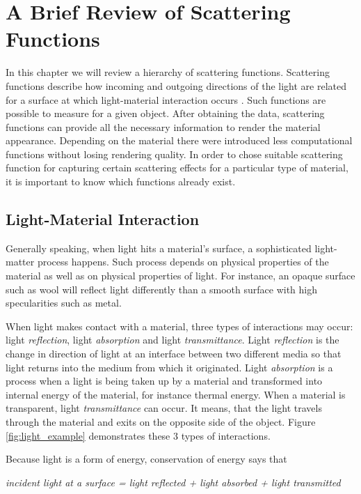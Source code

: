 \chapter{A Brief Review of Scattering Functions}
\label{chapter:appearance}

In this chapter we will review a hierarchy of scattering functions. 
Scattering functions describe how incoming and outgoing directions of the light are related for a surface at which light-material interaction occurs \cite{dong}.
Such functions are possible to measure for a given object.
After obtaining the data, scattering functions can provide all the necessary information to render the material appearance. 
 Depending on the material there were introduced less computational functions without losing rendering quality.
In order to chose suitable scattering function for capturing certain scattering effects for a particular type of material,
it is important to know which functions already exist. 

	
\section{Light-Material Interaction}
\label{section:light}	

Generally speaking, when light hits a material's surface, a sophisticated light-matter process happens.
Such process depends on physical properties of the material as well as on physical properties of light\cite{wynn}. 
For instance, an opaque surface such as wool will reflect light differently than a smooth surface with high specularities such as metal. 

 When light makes contact with a material, three types of interactions may occur: light \emph{reflection}, light \emph{absorption} and light \emph{transmittance}. 
 Light \emph{reflection} is the change in direction of light at an interface between two different media so that light returns into the medium from which it originated.
 Light \emph{absorption} is a process when a light is being taken up by a material and transformed into internal energy of the material, for instance thermal energy.
 When a material is transparent, light \emph{transmittance} can occur.
 It means, that the light travels through the material and exits on the opposite side of the object. 
   Figure \ref{fig:light_example} demonstrates these 3 types of interactions.
  
 Because light is a form of energy, conservation of energy says that \cite{wynn}
 \begin{center} 
\emph{incident light at a surface = light reflected + light absorbed + light transmitted}
 \end{center}
 


